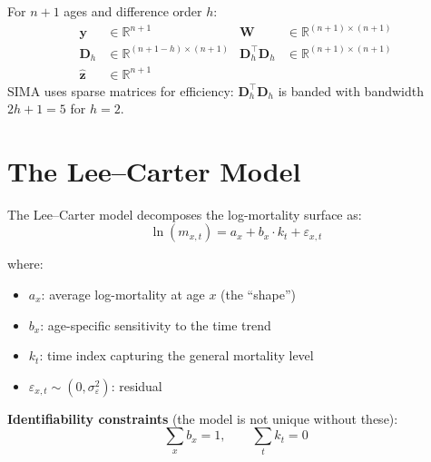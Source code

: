 \documentclass[11pt,a4paper]{article}
\theoremstyle{definition}
\newcommand{\R}{\mathbb{R}}
\begin{document}
\begin{dimcheck}
For $n+1$ ages and difference order $h$:
\begin{align*}
  \bm{y} &\in \R^{n+1} & \bm{W} &\in \R^{(n+1)\times(n+1)} \\
  \bm{D}_h &\in \R^{(n+1-h)\times(n+1)} & \bm{D}_h^\top\bm{D}_h &\in \R^{(n+1)\times(n+1)} \\
  \hat{\bm{z}} &\in \R^{n+1} & &
\end{align*}
SIMA uses sparse matrices for efficiency: $\bm{D}_h^\top\bm{D}_h$ is banded
with bandwidth $2h+1 = 5$ for $h=2$.
\end{dimcheck}

\section{The Lee--Carter Model}
\label{sec:lee-carter}

\begin{formaldef}
The Lee--Carter model decomposes the log-mortality surface as:
\begin{equation}
  \ln(m_{x,t}) = a_x + b_x \cdot k_t + \varepsilon_{x,t}
  \label{eq:lee-carter}
\end{equation}

where:
\begin{itemize}
  \item $a_x$: average log-mortality at age $x$ (the ``shape'')
  \item $b_x$: age-specific sensitivity to the time trend
  \item $k_t$: time index capturing the general mortality level
  \item $\varepsilon_{x,t} \sim (0, \sigma_\varepsilon^2)$: residual
\end{itemize}

\textbf{Identifiability constraints} (the model is not unique without these):
\begin{equation}
  \sum_x b_x = 1, \qquad \sum_t k_t = 0
  \label{eq:constraints}
\end{equation}
\end{formaldef}
\end{document}
